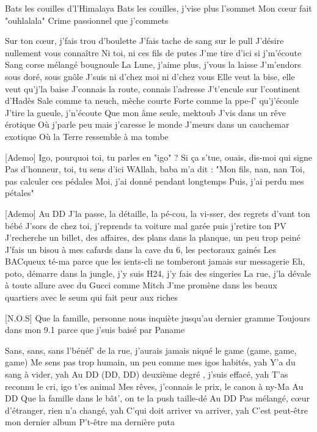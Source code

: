 \begin{guitar}
[Ademo]
Bats les couilles d'l'Himalaya
Bats les couilles, j'vise plus l'sommet
Mon cœur fait "ouhlalala"
Crime passionnel que j'commets

Sur ton cœur, j'fais trou d'boulette
J'fais tache de sang sur le pull
J'désire nullement vous connaître
Ni toi, ni ces fils de putes
J'me tire d'ici si j'm'écoute
Sang corse mélangé bougnoule
La Lune, j'aime plus, j'vous la laisse
J'm'endors sous doré, sous gnôle
J'suis ni d'chez moi ni d'chez vous
Elle veut la bise, elle veut qu'j'la baise
J'connais la route, connais l'adresse
J't'encule sur l'continent d'Hadès
Sale comme ta neuch, mèche courte
Forte comme la ppe-f' qu'j'écoule
J'tire la gueule, j'n'écoute
Que mon âme seule, mektoub
J'vis dans un rêve érotique
Où j'parle peu mais j'caresse le monde
J'meurs dans un cauchemar exotique
Où la Terre ressemble à ma tombe

[Ademo]
Igo, pourquoi toi, tu parles en "igo" ?
Si ça s'tue, ouais, dis-moi qui signe
Pas d'honneur, toi, tu sens d'ici
WAllah, baba m'a dit : "Mon fils, nan, nan
Toi, pas calculer ces pédales
Moi, j'ai donné pendant longtemps
Puis, j'ai perdu mes pétales"

[Ademo]
Au DD
J'la passe, la détaille, la pé-cou, la vi-sser, des regrets d'vant ton bébé
J'sors de chez toi, j'reprends ta voiture mal garée puis j'retire ton PV
J'recherche un billet, des affaires, des plans dans la planque, un peu trop peiné
J'fais un bisou à mes cafards dans la cave du 6, les pectoraux gainés
Les BACqueux té-ma parce que les ients-cli ne tomberont jamais sur messagerie
Eh, poto, démarre dans la jungle, j'y suis H24, j'y fais des singeries
La rue, j'la dévale à toute allure avec du Gucci comme Mitch
J'me promène dans les beaux quartiers avec le seum qui fait peur aux riches

[N.O.S]
Que la famille, personne nous inquiète jusqu'au dernier gramme
Toujours dans mon 9.1 parce que j'suis baisé par Paname

Sans, sans, sans l'bénéf' de la rue, j'aurais jamais niqué le game (game, game, game)
Me sens pas trop humain, un peu comme mes igos habités, yah
Y'a du sang à vider, yah
Au DD (DD, DD) deuxième degré , j'suis effacé, yah
T'as reconnu le cri, igo t'es animal
Mes rêves, j'connais le prix, le canon à ny-Ma
Au DD
Que la famille dans le bât', on te la push taille-dé
Au DD
Pas mélangé, cœur d'étranger, rien n'a changé, yah
C'qui doit arriver va arriver, yah
C'est peut-être mon dernier album
P't-être ma dernière puta


\end{guitar}
